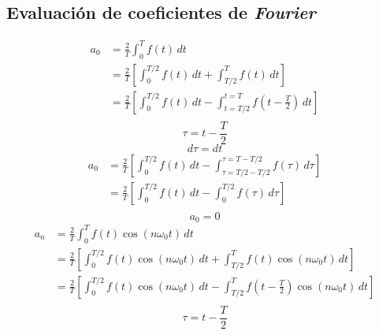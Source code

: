 \subsection{Evaluación de coeficientes de \emph{Fourier}}
\begin{equation*}
\begin{split}
    a_0
        &=\frac{2}{T}\int_0^T f(t)\,dt\\
        &=\frac{2}{T}\left[\int_0^{T/2} f(t)\,dt+\int_{T/2}^T f(t)\,dt\right]\\
        &=\frac{2}{T}\left[
            \int_0^{T/2} f(t)\,dt-\int_{t=T/2}^{t=T} f(t-\frac{T}{2})\,dt
        \right]\\
\end{split}
\end{equation*}
\begin{equation*}
    \tau=t-\frac{T}{2}
\end{equation*}
\begin{equation*}
    d\tau=dt
\end{equation*}
\begin{equation*}
\begin{split}
    a_0
        &=\frac{2}{T}\left[
            \int_0^{T/2} f(t)\,dt-
            \int_{\tau=T/2-T/2}^{\tau=T-T/2} f(\tau)\,d\tau
        \right]\\
        &=\frac{2}{T}\left[
            \int_0^{T/2} f(t)\,dt-\int_0^{T/2} f(\tau)\,d\tau
        \right]\\
\end{split}
\end{equation*}
\begin{equation}
    a_0=0
\end{equation}
\begin{equation*}
\begin{split}
    a_n
        &=\frac{2}{T}\int_0^T f(t)\cos(n\omega_0 t)\,dt\\
        &=\frac{2}{T}\left[
            \int_0^{T/2} f(t)\cos(n\omega_0 t)\,dt+
            \int_{T/2}^T f(t)\cos(n\omega_0 t)\,dt
        \right]\\
        &=\frac{2}{T}\left[
            \int_0^{T/2} f(t)\cos(n\omega_0 t)\,dt-
            \int_{T/2}^T f(t-\frac{T}{2})\cos(n\omega_0 t)\,dt
        \right]\\
\end{split}
\end{equation*}
\begin{equation*}
    \tau=t-\frac{T}{2}
\end{equation*}
